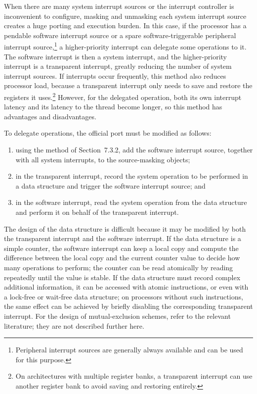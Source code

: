 When there are many system interrupt sources or the interrupt controller is inconvenient to configure, masking and unmasking each system interrupt source creates a huge porting and execution burden.
In this case, if the processor has a pendable software interrupt source or a spare software-triggerable peripheral interrupt source,\footnote{Peripheral interrupt sources are generally always available and can be used for this purpose.} a higher-priority interrupt can delegate some operations to it.
The software interrupt is then a system interrupt, and the higher-priority interrupt is a transparent interrupt, greatly reducing the number of system interrupt sources.
If interrupts occur frequently, this method also reduces processor load, because a transparent interrupt only needs to save and restore the registers it uses.\footnote{On architectures with multiple register banks, a transparent interrupt can use another register bank to avoid saving and restoring entirely.}
However, for the delegated operation, both its own interrupt latency and its latency to the thread become longer, so this method has advantages and disadvantages.

To delegate operations, the official port must be modified as follows:

\begin{enumerate}
    \item using the method of Section~7.3.2, add the software interrupt source, together with all system interrupts, to the source-masking objects;
    \item in the transparent interrupt, record the system operation to be performed in a data structure and trigger the software interrupt source; and
    \item in the software interrupt, read the system operation from the data structure and perform it on behalf of the transparent interrupt.
\end{enumerate}

The design of the data structure is difficult because it may be modified by both the transparent interrupt and the software interrupt.
If the data structure is a simple counter, the software interrupt can keep a local copy and compute the difference between the local copy and the current counter value to decide how many operations to perform; the counter can be read atomically by reading repeatedly until the value is stable.
If the data structure must record complex additional information, it can be accessed with atomic instructions, or even with a lock-free or wait-free data structure; on processors without such instructions, the same effect can be achieved by briefly disabling the corresponding transparent interrupt.
For the design of mutual-exclusion schemes, refer to the relevant literature; they are not described further here.

